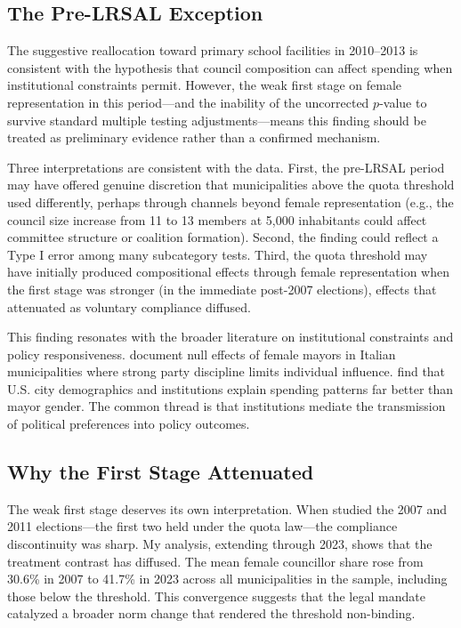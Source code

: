 \documentclass[12pt]{article}
\begin{document}
\subsection{The Pre-LRSAL Exception}

The suggestive reallocation toward primary school facilities in 2010--2013 is consistent with the hypothesis that council composition can affect spending when institutional constraints permit. However, the weak first stage on female representation in this period---and the inability of the uncorrected $p$-value to survive standard multiple testing adjustments---means this finding should be treated as preliminary evidence rather than a confirmed mechanism.

Three interpretations are consistent with the data. First, the pre-LRSAL period may have offered genuine discretion that municipalities above the quota threshold used differently, perhaps through channels beyond female representation (e.g., the council size increase from 11 to 13 members at 5,000 inhabitants could affect committee structure or coalition formation). Second, the finding could reflect a Type I error among many subcategory tests. Third, the quota threshold may have initially produced compositional effects through female representation when the first stage was stronger (in the immediate post-2007 elections), effects that attenuated as voluntary compliance diffused.

This finding resonates with the broader literature on institutional constraints and policy responsiveness. \citet{gagliarducci2013gender} document null effects of female mayors in Italian municipalities where strong party discipline limits individual influence. \citet{ferreira2014does} find that U.S. city demographics and institutions explain spending patterns far better than mayor gender. The common thread is that institutions mediate the transmission of political preferences into policy outcomes.

\subsection{Why the First Stage Attenuated}

The weak first stage deserves its own interpretation. When \citet{bagues2021can} studied the 2007 and 2011 elections---the first two held under the quota law---the compliance discontinuity was sharp. My analysis, extending through 2023, shows that the treatment contrast has diffused. The mean female councillor share rose from 30.6\% in 2007 to 41.7\% in 2023 across all municipalities in the sample, including those below the threshold. This convergence suggests that the legal mandate catalyzed a broader norm change that rendered the threshold non-binding.
\end{document}
